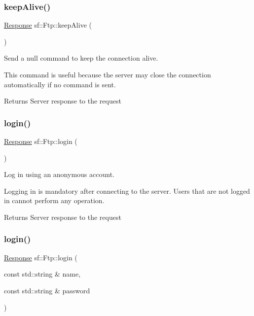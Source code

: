 \subsubsection{\texorpdfstring{keep\+Alive()}{keepAlive()}}
{\footnotesize\ttfamily \hyperlink{classsf_1_1_ftp_1_1_response}{Response} sf\+::\+Ftp\+::keep\+Alive (\begin{DoxyParamCaption}{ }\end{DoxyParamCaption})}



Send a null command to keep the connection alive. 

This command is useful because the server may close the connection automatically if no command is sent.

\begin{DoxyReturn}{Returns}
Server response to the request 
\end{DoxyReturn}
\mbox{\label{classsf_1_1_ftp_a686262bc377584cd50e52e1576aa3a9b}} 
\subsubsection{\texorpdfstring{login()}{login()}\hspace{0.1cm}{\footnotesize\ttfamily [1/2]}}
{\footnotesize\ttfamily \hyperlink{classsf_1_1_ftp_1_1_response}{Response} sf\+::\+Ftp\+::login (\begin{DoxyParamCaption}{ }\end{DoxyParamCaption})}



Log in using an anonymous account. 

Logging in is mandatory after connecting to the server. Users that are not logged in cannot perform any operation.

\begin{DoxyReturn}{Returns}
Server response to the request 
\end{DoxyReturn}
\mbox{\label{classsf_1_1_ftp_a99d8114793c1659e9d51d45cecdcd965}} 
\subsubsection{\texorpdfstring{login()}{login()}\hspace{0.1cm}{\footnotesize\ttfamily [2/2]}}
{\footnotesize\ttfamily \hyperlink{classsf_1_1_ftp_1_1_response}{Response} sf\+::\+Ftp\+::login (\begin{DoxyParamCaption}\item[{const std\+::string \&}]{name,  }\item[{const std\+::string \&}]{password }\end{DoxyParamCaption})}



